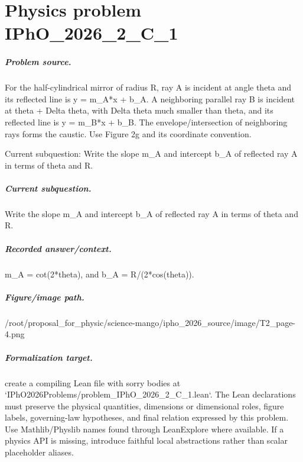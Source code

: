 
\chapter{Physics problem IPhO\_2026\_2\_C\_1}
\label{ch:IPhO2026Problems_problem_IPhO_2026_2_C_1}

\paragraph{Problem source.}
For the half-cylindrical mirror of radius R, ray A is incident at angle theta
and its reflected line is y = m\_A*x + b\_A.  A neighboring parallel ray B is
incident at theta + Delta theta, with Delta theta much smaller than theta, and
its reflected line is y = m\_B*x + b\_B.  The envelope/intersection of neighboring
rays forms the caustic.  Use Figure 2g and its coordinate convention.

Current subquestion:
Write the slope m\_A and intercept b\_A of reflected ray A in terms of theta and R.

\paragraph{Current subquestion.}
Write the slope m\_A and intercept b\_A of reflected ray A in terms of theta and R.

\paragraph{Recorded answer/context.}
m\_A = cot(2*theta), and b\_A = R/(2*cos(theta)).

\paragraph{Figure/image path.}
/root/proposal\_for\_physic/science-mango/ipho\_2026\_source/image/T2\_page-4.png

\paragraph{Formalization target.}
create a compiling Lean file with sorry bodies at `IPhO2026Problems/problem\_IPhO\_2026\_2\_C\_1.lean`. The Lean declarations must preserve the physical quantities, dimensions or dimensional roles, figure labels, governing-law hypotheses, and final relation expressed by this problem.
Use Mathlib/Physlib names found through LeanExplore where available. If a physics API is missing, introduce faithful local abstractions rather than scalar placeholder aliases.

